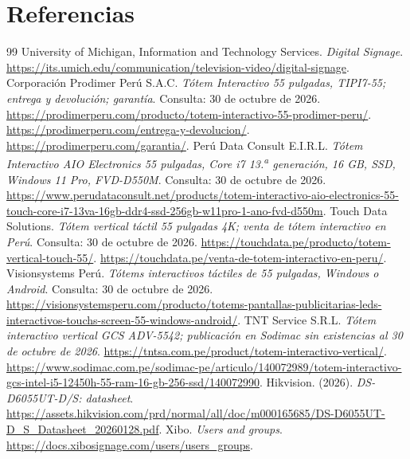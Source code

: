 \section*{Referencias}
\begingroup\small{}
\renewcommand{\section}[2]{}
\begin{thebibliography}{99}
\setlength{\itemsep}{6pt}
 University of Michigan, Information and Technology Services. \emph{Digital Signage}. \url{https://its.umich.edu/communication/television-video/digital-signage}.
 Corporación Prodimer Perú S.A.C. \emph{Tótem Interactivo 55 pulgadas, TIPI7-55; entrega y devolución; garantía}. Consulta: 30 de octubre de 2026. \url{https://prodimerperu.com/producto/totem-interactivo-55-prodimer-peru/}. \url{https://prodimerperu.com/entrega-y-devolucion/}. \url{https://prodimerperu.com/garantia/}.
 Perú Data Consult E.I.R.L. \emph{Tótem Interactivo AIO Electronics 55 pulgadas, Core i7 13.\textsuperscript{a} generación, 16 GB, SSD, Windows 11 Pro, FVD-D550M}. Consulta: 30 de octubre de 2026. \url{https://www.perudataconsult.net/products/totem-interactivo-aio-electronics-55-touch-core-i7-13va-16gb-ddr4-ssd-256gb-w11pro-1-ano-fvd-d550m}.
 Touch Data Solutions. \emph{Tótem vertical táctil 55 pulgadas 4K; venta de tótem interactivo en Perú}. Consulta: 30 de octubre de 2026. \url{https://touchdata.pe/producto/totem-vertical-touch-55/}. \url{https://touchdata.pe/venta-de-totem-interactivo-en-peru/}.
 Visionsystems Perú. \emph{Tótems interactivos táctiles de 55 pulgadas, Windows o Android}. Consulta: 30 de octubre de 2026. \url{https://visionsystemsperu.com/producto/totems-pantallas-publicitarias-leds-interactivos-touchs-screen-55-windows-android/}.
 TNT Service S.R.L. \emph{Tótem interactivo vertical GCS ADV-5542; publicación en Sodimac sin existencias al 30 de octubre de 2026}. \url{https://tntsa.com.pe/product/totem-interactivo-vertical/}. \url{https://www.sodimac.com.pe/sodimac-pe/articulo/140072989/totem-interactivo-gcs-intel-i5-12450h-55-ram-16-gb-256-ssd/140072990}.
 Hikvision. (2026). \emph{DS-D6055UT-D/S: datasheet}. \url{https://assets.hikvision.com/prd/normal/all/doc/m000165685/DS-D6055UT-D_S_Datasheet_20260128.pdf}.
 Xibo. \emph{Users and groups}. \url{https://docs.xibosignage.com/users/users_groups}.

\end{thebibliography}
